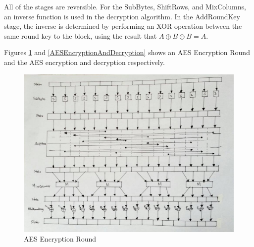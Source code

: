 \documentclass{article}
\begin{document}
All of the stages are reversible. For the SubBytes, ShiftRows, and  MixColumns, an inverse function is used in the decryption algorithm. In the AddRoundKey stage, the inverse is determined by performing an XOR operation between the same round key to the block, using the result that $A\oplus B\oplus B = A$.

Figures \ref{AESEncryptionRound} and \ref{AESEncryptionAndDecryption} shows an AES Encryption Round and the AES encryption and decryption respectively.

\begin{figure}[h]
\begin{center}
\includegraphics[scale=.4]{AESEncryptionRound2.jpg}
\caption{AES Encryption Round}
\label{AESEncryptionRound}
\end{center}
\end{figure}
\end{document}
